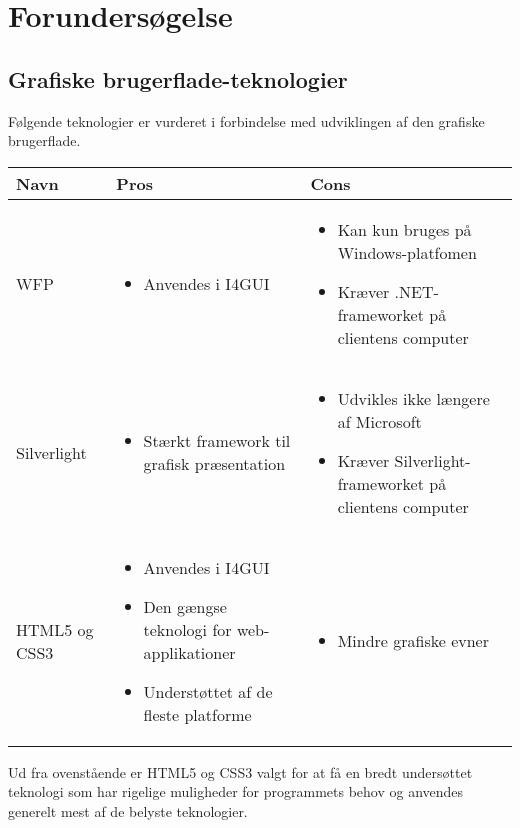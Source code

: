 \chapter{Forundersøgelse}

\section{Grafiske brugerflade-teknologier}

Følgende teknologier er vurderet i forbindelse med udviklingen af den grafiske brugerflade.

\begin{tabular}{|p{3cm}|p{5.5cm}|p{5.5cm}|}
\hline 
\textbf{Navn} & \textbf{Pros} & \textbf{Cons} \\ 
\hline

WFP
	&
	\begin{itemize}
		\item Anvendes i I4GUI
	\end{itemize}
	&
	\begin{itemize}
		\item Kan kun bruges på Windows-platfomen
		\item Kræver .NET-frameworket på clientens computer
	\end{itemize}
	\\
	\hline

Silverlight
	&
	\begin{itemize}
		\item Stærkt framework til grafisk præsentation
	\end{itemize}
	&
	\begin{itemize}
		\item Udvikles ikke længere af Microsoft
		\item Kræver Silverlight-\newline frameworket på clientens computer
	\end{itemize}
	\\
	\hline

HTML5 og CSS3
	&
	\begin{itemize}
		\item Anvendes i I4GUI
		\item Den gængse teknologi for web-applikationer
		\item Understøttet af de fleste platforme
	\end{itemize}
	&
	\begin{itemize}
	\item Mindre grafiske evner
	\end{itemize}
	\\
	\hline
\end{tabular} 

Ud fra ovenstående er HTML5 og CSS3 valgt for at få en bredt undersøttet teknologi som har rigelige muligheder for programmets behov og anvendes generelt mest af de belyste teknologier.